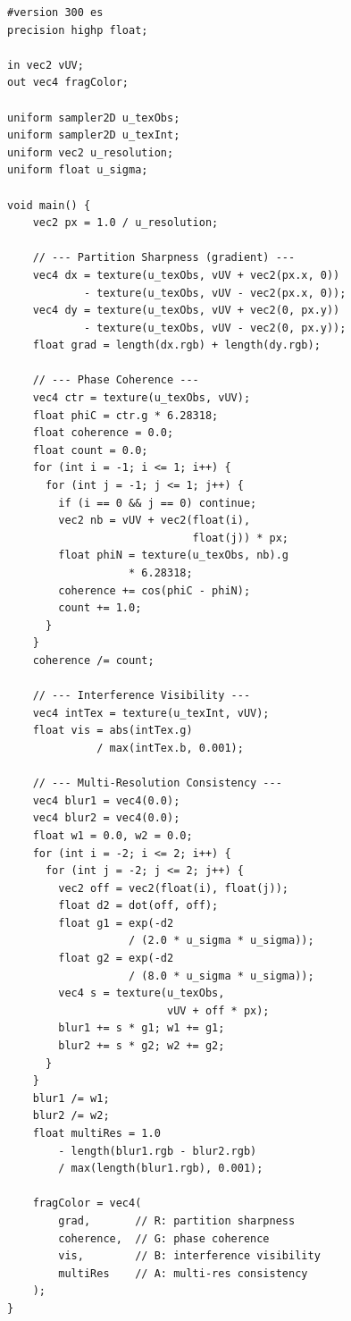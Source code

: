 \documentclass[11pt,twocolumn,a4paper]{article}
\begin{document}
\begin{lstlisting}[style=glsl,caption={SBS Universal Quality Metric Shader.}]
#version 300 es
precision highp float;

in vec2 vUV;
out vec4 fragColor;

uniform sampler2D u_texObs;
uniform sampler2D u_texInt;
uniform vec2 u_resolution;
uniform float u_sigma;

void main() {
    vec2 px = 1.0 / u_resolution;

    // --- Partition Sharpness (gradient) ---
    vec4 dx = texture(u_texObs, vUV + vec2(px.x, 0))
            - texture(u_texObs, vUV - vec2(px.x, 0));
    vec4 dy = texture(u_texObs, vUV + vec2(0, px.y))
            - texture(u_texObs, vUV - vec2(0, px.y));
    float grad = length(dx.rgb) + length(dy.rgb);

    // --- Phase Coherence ---
    vec4 ctr = texture(u_texObs, vUV);
    float phiC = ctr.g * 6.28318;
    float coherence = 0.0;
    float count = 0.0;
    for (int i = -1; i <= 1; i++) {
      for (int j = -1; j <= 1; j++) {
        if (i == 0 && j == 0) continue;
        vec2 nb = vUV + vec2(float(i),
                             float(j)) * px;
        float phiN = texture(u_texObs, nb).g
                   * 6.28318;
        coherence += cos(phiC - phiN);
        count += 1.0;
      }
    }
    coherence /= count;

    // --- Interference Visibility ---
    vec4 intTex = texture(u_texInt, vUV);
    float vis = abs(intTex.g)
              / max(intTex.b, 0.001);

    // --- Multi-Resolution Consistency ---
    vec4 blur1 = vec4(0.0);
    vec4 blur2 = vec4(0.0);
    float w1 = 0.0, w2 = 0.0;
    for (int i = -2; i <= 2; i++) {
      for (int j = -2; j <= 2; j++) {
        vec2 off = vec2(float(i), float(j));
        float d2 = dot(off, off);
        float g1 = exp(-d2
                   / (2.0 * u_sigma * u_sigma));
        float g2 = exp(-d2
                   / (8.0 * u_sigma * u_sigma));
        vec4 s = texture(u_texObs,
                         vUV + off * px);
        blur1 += s * g1; w1 += g1;
        blur2 += s * g2; w2 += g2;
      }
    }
    blur1 /= w1;
    blur2 /= w2;
    float multiRes = 1.0
        - length(blur1.rgb - blur2.rgb)
        / max(length(blur1.rgb), 0.001);

    fragColor = vec4(
        grad,       // R: partition sharpness
        coherence,  // G: phase coherence
        vis,        // B: interference visibility
        multiRes    // A: multi-res consistency
    );
}
\end{lstlisting}
\end{document}
